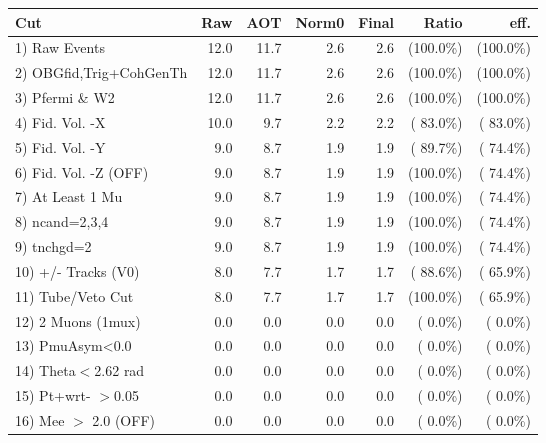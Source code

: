  \begin{table}[h!]\centering
 \begin{tabular}{||l||r|r|r|r|r|r||}
 \hline
 \hline
 Cut & Raw & AOT & Norm0 & Final & Ratio & eff.       \\
 \hline
  1) Raw Events           &         12.0 &         11.7 &          2.6 &          2.6 & (100.0\%) & (100.0\%) \\
  2) OBGfid,Trig+CohGenTh &         12.0 &         11.7 &          2.6 &          2.6 & (100.0\%) & (100.0\%) \\
  3) Pfermi \& W2         &         12.0 &         11.7 &          2.6 &          2.6 & (100.0\%) & (100.0\%) \\
  4) Fid. Vol. -X         &         10.0 &          9.7 &          2.2 &          2.2 & ( 83.0\%) & ( 83.0\%) \\
  5) Fid. Vol. -Y         &          9.0 &          8.7 &          1.9 &          1.9 & ( 89.7\%) & ( 74.4\%) \\
  6) Fid. Vol. -Z (OFF)   &          9.0 &          8.7 &          1.9 &          1.9 & (100.0\%) & ( 74.4\%) \\
  7) At Least 1 Mu        &          9.0 &          8.7 &          1.9 &          1.9 & (100.0\%) & ( 74.4\%) \\
  8) ncand=2,3,4          &          9.0 &          8.7 &          1.9 &          1.9 & (100.0\%) & ( 74.4\%) \\
  9) tnchgd=2             &          9.0 &          8.7 &          1.9 &          1.9 & (100.0\%) & ( 74.4\%) \\
 10) +/- Tracks (V0)      &          8.0 &          7.7 &          1.7 &          1.7 & ( 88.6\%) & ( 65.9\%) \\
 11) Tube/Veto Cut        &          8.0 &          7.7 &          1.7 &          1.7 & (100.0\%) & ( 65.9\%) \\
 12) 2 Muons (1mux)       &          0.0 &          0.0 &          0.0 &          0.0 & (  0.0\%) & (  0.0\%) \\
 13) PmuAsym<0.0          &          0.0 &          0.0 &          0.0 &          0.0 & (  0.0\%) & (  0.0\%) \\
 14) Theta$<$2.62 rad     &          0.0 &          0.0 &          0.0 &          0.0 & (  0.0\%) & (  0.0\%) \\
 15) Pt+wrt- $>$0.05      &          0.0 &          0.0 &          0.0 &          0.0 & (  0.0\%) & (  0.0\%) \\
 16) Mee $>$ 2.0  (OFF)   &          0.0 &          0.0 &          0.0 &          0.0 & (  0.0\%) & (  0.0\%) \\

\end{tabular}
\end{table}
